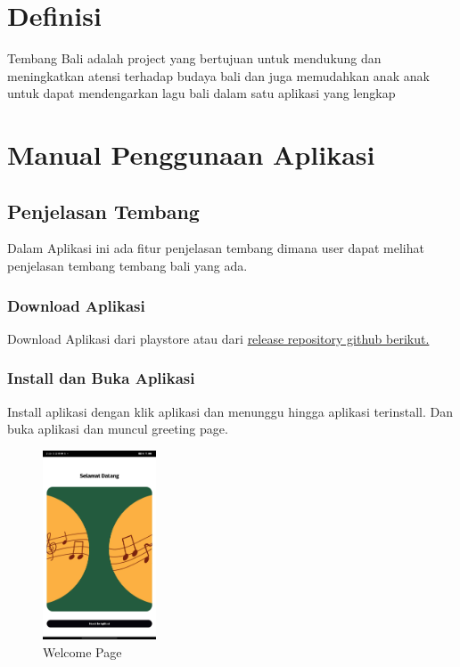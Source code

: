 \documentclass[a4paper, 12pt]{article}
\begin{document}
\tableofcontents

\section{Definisi}
Tembang Bali adalah project yang bertujuan untuk mendukung dan meningkatkan atensi terhadap budaya bali dan juga memudahkan 
anak anak untuk dapat mendengarkan lagu bali dalam satu aplikasi yang lengkap

\section{Manual Penggunaan Aplikasi}

\subsection{Penjelasan Tembang}
Dalam Aplikasi ini ada fitur penjelasan tembang dimana user dapat melihat penjelasan tembang tembang bali yang ada.
\subsubsection{Download Aplikasi}
Download Aplikasi dari playstore atau dari \href{https://github.com/rahdeva/tembang_bali}{release repository github berikut.} 

\subsubsection{Install dan Buka Aplikasi}
Install aplikasi dengan klik aplikasi dan menunggu hingga aplikasi terinstall. Dan buka aplikasi dan muncul greeting page.

\begin{figure}[H]
    \centering
    \includegraphics[width=0.3\textwidth]{assets/welcome.jpg}
    \caption{Welcome Page}
\end{figure}
\end{document}
